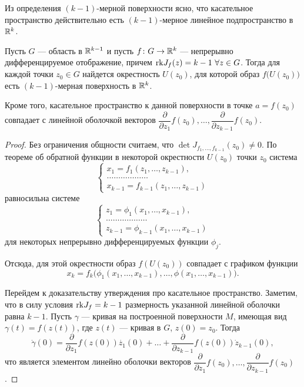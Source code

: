 \documentclass[a4paper]{article}
\theoremstyle{named}
\begin{document}
    Из определения $(k-1)$-мерной поверхности ясно, что касательное пространство действительно есть $(k-1)$-мерное линейное подпространство в $\mathbb{R}^k$. 
    
    \begin{proposal*}
        Пусть $G$ --- область в $\mathbb{R}^{k-1}$	и пусть $f\colon G\to \mathbb{R}^k$ --- непрерывно дифференцируемое отображение,
        причем ${\rm rk}J_f(z) = k-1\ \forall z\in G$.
        Тогда для каждой точки $z_0\in G$ найдется окрестность $U(z_0)$, для которой образ $f\bigl(U(z_0)\bigr)$ есть $(k-1)$-мерная поверхность в $\mathbb{R}^k$.
    
        Кроме того, касательное пространство к данной поверхности в точке $a=f(z_0)$ совпадает с линейной оболочкой векторов $\dfrac{\partial}{\partial z_1}f(z_0),\ldots, \dfrac{\partial}{\partial z_{k-1}}f(z_0)$.
    \end{proposal*}
    
    \begin{proof}
        Без ограничения общности считаем, что $\det J_{f_1,\ldots, f_{k-1}}(z_0)\ne 0$.
        По теореме об обратной функции в некоторой окрестности $U(z_0)$ точки $z_0$	система
        $$
            \begin{cases}
                x_1=f_1(z_1,\ldots, z_{k-1}),\\
                \ldots\ldots\ldots\ldots\ldots\ldots\\
                x_{k-1}=f_{k-1}(z_1,\ldots, z_{k-1})
            \end{cases}
        $$
        равносильна системе
        $$
            \begin{cases}
                z_1=\phi_1(x_1,\ldots, x_{k-1}),\\
                \ldots\ldots\ldots\ldots\ldots\ldots\\
                z_{k-1}=\phi_{k-1}(x_1,\ldots, x_{k-1})
            \end{cases}
        $$
        для некоторых непрерывно дифференцируемых функции $\phi_j$.
    
        Отсюда, для этой окрестности образ $f(U(z_0))$ совпадает с графиком функции
        $$x_k = f_k\bigl(\phi_1(x_1,\ldots, x_{k-1}),\ldots, \phi(x_1,\ldots, x_{k-1})\bigr).$$
    
        Перейдем к доказательству утверждения про касательное пространство.
        Заметим, что в силу условия ${\rm rk}J_f = k-1$ размерность указанной линейной оболочки равна $k-1$.
        Пусть $\gamma$ --- кривая на построенной поверхности $M$, имеющая вид $\gamma(t)= f(z(t))$, где $z(t)$ --- кривая в $G$, $z(0) = z_0$.
        Тогда
        $$
            \dot{\gamma}(0)	= \dfrac{\partial}{\partial z_1}f(z(0))\dot{z_1}(0) + \ldots +
            \dfrac{\partial}{\partial z_{k-1}}f(z(0))\dot{z}_{k-1}(0),
        $$
        что является элементом линейно оболочки векторов $\dfrac{\partial}{\partial z_1}f(z_0),\ldots, \dfrac{\partial}{\partial z_{k-1}}f(z_0)$.
    \end{proof}
\end{document}

